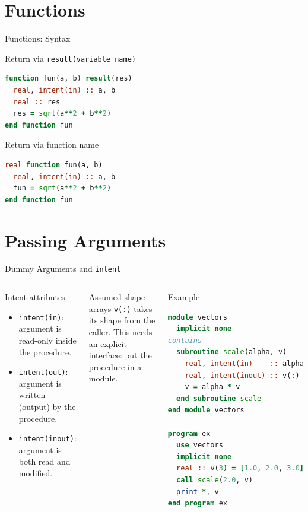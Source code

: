 \section{Functions}

\begin{frame}[fragile]{Functions: Syntax}
\begin{block}{Return via \texttt{result(variable\_name)}}
\begin{lstlisting}[language=Fortran]
function fun(a, b) result(res)
  real, intent(in) :: a, b
  real :: res
  res = sqrt(a**2 + b**2)
end function fun
\end{lstlisting}
\end{block}

\begin{block}{Return via function name}
\begin{lstlisting}[language=Fortran]
real function fun(a, b)
  real, intent(in) :: a, b
  fun = sqrt(a**2 + b**2)
end function fun
\end{lstlisting}
\end{block}
\end{frame}

\section{Passing Arguments}

\begin{frame}[fragile]{Dummy Arguments and \texttt{intent}}
  \begin{columns}[T]
    \begin{block}{Intent attributes}
      \begin{itemize}
        \item \texttt{intent(in)}: argument is read-only inside the procedure.
        \item \texttt{intent(out)}: argument is written (output) by the procedure.
        \item \texttt{intent(inout)}: argument is both read and modified.
      \end{itemize}
    \end{block}
    \begin{block}{Assumed-shape arrays}
      \texttt{v(:)} takes its shape from the caller. This needs an explicit interface: put the procedure in a module.
    \end{block}

    \begin{block}{Example}
\begin{lstlisting}[language=Fortran]
module vectors
  implicit none
contains
  subroutine scale(alpha, v)
    real, intent(in)    :: alpha
    real, intent(inout) :: v(:)
    v = alpha * v
  end subroutine scale
end module vectors

program ex
  use vectors
  implicit none
  real :: v(3) = [1.0, 2.0, 3.0]
  call scale(2.0, v)
  print *, v
end program ex
\end{lstlisting}
    \end{block}
  \end{columns}
\end{frame}


